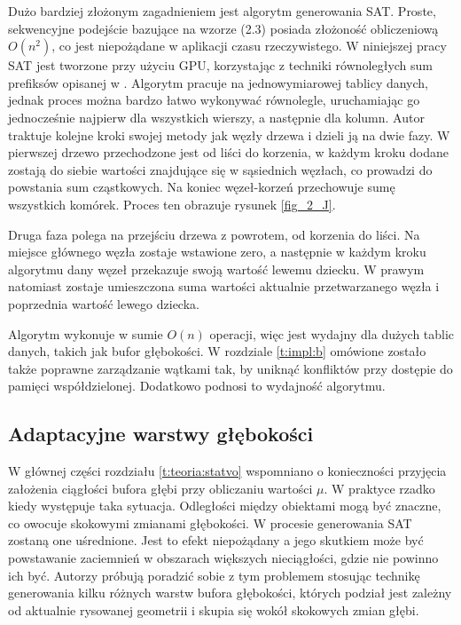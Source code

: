 		Dużo bardziej złożonym zagadnieniem jest algorytm generowania SAT. Proste, sekwencyjne podejście bazujące na wzorze (2.3) posiada złożoność obliczeniową \(O(n^2)\), co jest niepożądane w aplikacji czasu rzeczywistego. W niniejszej pracy SAT jest tworzone przy użyciu GPU, korzystając z techniki równoległych sum prefiksów opisanej w \cite{prefix-sum}. Algorytm pracuje na jednowymiarowej tablicy danych, jednak proces można bardzo łatwo wykonywać równolegle, uruchamiając go jednocześnie najpierw dla wszystkich wierszy, a następnie dla kolumn. Autor traktuje kolejne kroki swojej metody jak węzły drzewa i dzieli ją na dwie fazy. W pierwszej drzewo przechodzone jest od liści do korzenia, w każdym kroku dodane zostają do siebie wartości znajdujące się w sąsiednich węzłach, co prowadzi do powstania sum cząstkowych. Na koniec węzeł-korzeń przechowuje sumę wszystkich komórek. Proces ten obrazuje rysunek \ref{fig_2_J}.
		
		
		Druga faza polega na przejściu drzewa z powrotem, od korzenia do liści. Na miejsce głównego węzła zostaje wstawione zero, a następnie w każdym kroku algorytmu dany węzeł przekazuje swoją wartość lewemu dziecku. W prawym natomiast zostaje umieszczona suma wartości aktualnie przetwarzanego węzła i poprzednia wartość lewego dziecka.
		
		
		Algorytm wykonuje w sumie \(O(n)\) operacji, więc jest wydajny dla dużych tablic danych, takich jak bufor głębokości. W rozdziale \ref{t:impl:b} omówione zostało także poprawne zarządzanie wątkami tak, by uniknąć konfliktów przy dostępie do pamięci współdzielonej. Dodatkowo podnosi to wydajność algorytmu.
		
		\subsection{Adaptacyjne warstwy głębokości}
		\label{t:teoria:statvo:adaptive}
		
		W głównej części rozdziału \ref{t:teoria:statvo} wspomniano o konieczności przyjęcia założenia ciągłości bufora głębi przy obliczaniu wartości \(\mu\). W praktyce rzadko kiedy występuje taka sytuacja. Odległości między obiektami mogą być znaczne, co owocuje skokowymi zmianami głębokości. W procesie generowania SAT zostaną one uśrednione. Jest to efekt niepożądany a jego skutkiem może być powstawanie zaciemnień w obszarach większych nieciągłości, gdzie nie powinno ich być. Autorzy \cite{statvo} próbują poradzić sobie z tym problemem stosując technikę generowania kilku różnych warstw bufora głębokości, których podział jest zależny od aktualnie rysowanej geometrii i skupia się wokół skokowych zmian głębi.
		
